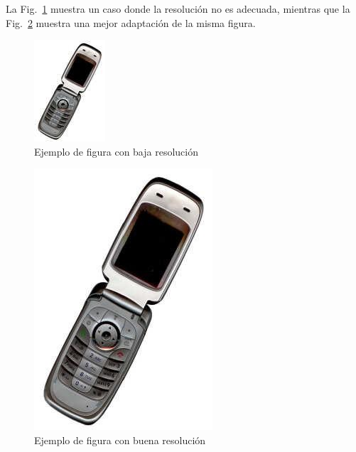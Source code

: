 ﻿\documentclass[10pt,twocolumn]{article}
\begin{document}
La Fig.~\ref{fig:low-res} muestra un caso donde la resolución no es adecuada, mientras que la Fig.~\ref{fig:good-res} muestra una mejor adaptación de la misma figura.

\begin{figure}[t]
  \centering
  \includegraphics[width=0.55\columnwidth]{img/image1.jpg}
  \caption{Ejemplo de figura con baja resolución}
  \label{fig:low-res}
\end{figure}

\begin{figure}[t]
  \centering
  \includegraphics[width=0.53\columnwidth]{img/image2.jpg}
  \caption{Ejemplo de figura con buena resolución}
  \label{fig:good-res}
\end{figure}
\end{document}

